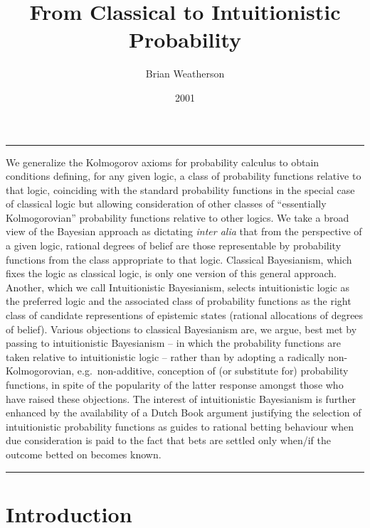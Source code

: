\documentclass[
  10pt,
  letterpaper,
  DIV=11,
  numbers=noendperiod,
  twoside]{scrartcl}
\title{From Classical to Intuitionistic Probability}
\author{Brian Weatherson}
\date{2001}
\renewenvironment{abstract}
 {\vspace{-1.25cm}
 \quotation\small\noindent\rule{\linewidth}{.5pt}\par\smallskip
 \noindent }
 {\par\noindent\rule{\linewidth}{.5pt}\endquotation}
\begin{document}
\maketitle
\begin{abstract}
We generalize the Kolmogorov axioms for probability calculus to obtain
conditions defining, for any given logic, a class of probability
functions relative to that logic, coinciding with the standard
probability functions in the special case of classical logic but
allowing consideration of other classes of ``essentially Kolmogorovian''
probability functions relative to other logics. We take a broad view of
the Bayesian approach as dictating \emph{inter alia} that from the
perspective of a given logic, rational degrees of belief are those
representable by probability functions from the class appropriate to
that logic. Classical Bayesianism, which fixes the logic as classical
logic, is only one version of this general approach. Another, which we
call Intuitionistic Bayesianism, selects intuitionistic logic as the
preferred logic and the associated class of probability functions as the
right class of candidate representions of epistemic states (rational
allocations of degrees of belief). Various objections to classical
Bayesianism are, we argue, best met by passing to intuitionistic
Bayesianism -- in which the probability functions are taken relative to
intuitionistic logic -- rather than by adopting a radically
non-Kolmogorovian, e.g.~non-additive, conception of (or substitute for)
probability functions, in spite of the popularity of the latter response
amongst those who have raised these objections. The interest of
intuitionistic Bayesianism is further enhanced by the availability of a
Dutch Book argument justifying the selection of intuitionistic
probability functions as guides to rational betting behaviour when due
consideration is paid to the fact that bets are settled only when/if the
outcome betted on becomes known.
\end{abstract}

\section{Introduction}\label{introduction}
\end{document}
